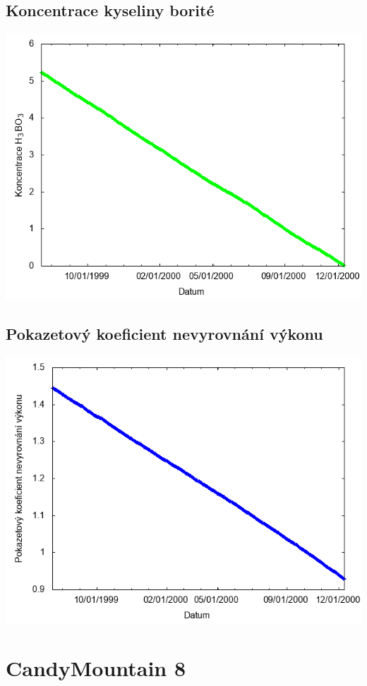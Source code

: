 \documentclass[a4paper,twoside,11pt]{article}
\begin{document}
\subsection*{Koncentrace kyseliny borité}
\begin{center}
\includegraphics[width=.8\textwidth]{graphs/CandyMountain_07_bc.png}
\end{center}

\subsection*{Pokazetový koeficient nevyrovnání výkonu}
\begin{center}
\includegraphics[width=.8\textwidth]{graphs/CandyMountain_07_fha.png}
\end{center}

\newpage
\section*{CandyMountain 8}
\end{document}

